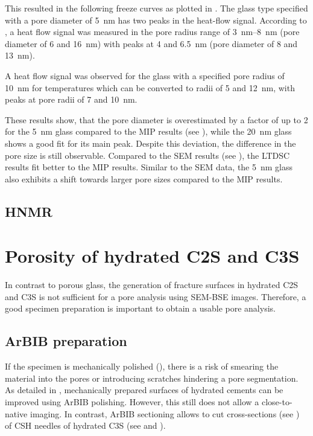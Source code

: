 This resulted in the following freeze curves as plotted in .
The glass type specified with a pore diameter of \qty{5}{\nano\meter} has two peaks in the heat-flow signal.
According to  \cite{brun.1977}, a heat flow signal was measured in the pore radius range of \qtyrange{3}{8}{\nano\meter} (pore diameter of \num{6} and \qty{16}{\nano\meter}) with peaks at \num{4} and \qty{6.5}{\nano\meter} (pore diameter of \num{8} and \qty{13}{\nano\meter}).

A heat flow signal was observed for the glass with a specified pore radius of \qty{10}{\nano\meter} for temperatures which can be converted to radii of \num{5} and \qty{12}{\nano\meter}, with peaks at pore radii of \num{7} and \qty{10}{\nano\meter}.

These results show, that the pore diameter is overestimated by a factor of up to \num{2} for the \qty{5}{\nano\meter} glass compared to the \ac{MIP} results (see ), while the \qty{20}{\nano\meter} glass shows a good fit for its main peak.
Despite this deviation, the difference in the pore size is still observable.
Compared to the \ac{SEM} results (see ), the \ac{LTDSC} results fit better to the \ac{MIP} results.
Similar to the \ac{SEM} data, the \qty{5}{\nano\meter} glass also exhibits a shift towards larger pore sizes compared to the \ac{MIP} results.


\subsection{\acs*{HNMR}}



\FloatBarrier
\section{Porosity of hydrated \acs*{C2S} and \acs*{C3S}}

In contrast to porous glass, the generation of fracture surfaces in hydrated \ac{C2S} and \ac{C3S} is not sufficient for a pore analysis using \ac{SEM}-\ac{BSE} images.
Therefore, a good specimen preparation is important  to obtain a usable pore analysis.

\subsection{\acs*{ArBIB} preparation}

If the specimen is mechanically polished (), there is a risk of smearing the material into the pores or introducing scratches hindering a pore segmentation.
As detailed in , mechanically prepared surfaces of hydrated cements can be improved using \ac{ArBIB} polishing.
However, this still does not allow a close-to-native imaging.
In contrast, \ac{ArBIB} sectioning allows to cut cross-sections (see ) of \ac{CSH} needles of hydrated \ac{C3S} (see  and ).

